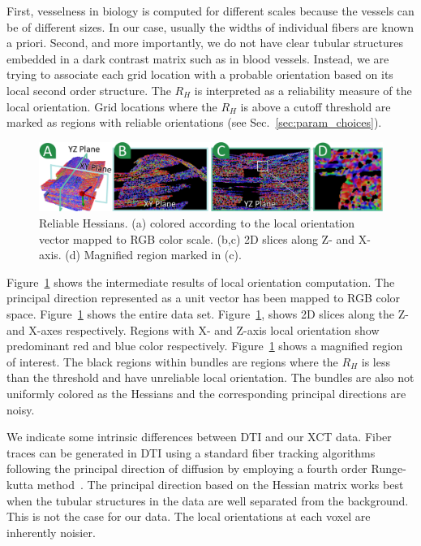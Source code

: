 First, vesselness in biology is computed for different scales because the vessels can be of different sizes. In our case, usually the widths of individual fibers are known a priori.
Second, and more importantly, we do not have clear tubular structures embedded in a dark contrast matrix such as in blood vessels.
Instead, we are trying to associate each grid location  with a probable orientation based on its local second order structure. The $R_{H}$ is interpreted as a reliability measure of the local orientation.
Grid locations where the $R_{H}$ is above a cutoff threshold are marked as regions with reliable orientations (see Sec.~\ref{sec:param_choices}).

\begin{figure}[tb]
\centering
\includegraphics[width=\linewidth]{images/reliable_hessian.eps}
 \vspace{-1.5em}
\caption{Reliable Hessians. (a) \mt colored according to the local orientation vector mapped to RGB color scale. (b,c) 2D slices along Z- and X- axis. (d) Magnified region marked in (c).}
\label{fig:reliable_hessian}
\vskip-0.2cm
\end{figure}
Figure~\ref{fig:reliable_hessian} shows the intermediate results of local orientation computation.
The principal direction represented as a unit vector has been mapped to RGB color space.
Figure~\ref{fig:reliable_hessian} shows the entire data set. 
Figure~\ref{fig:reliable_hessian}, shows 2D slices along the Z- and X-axes respectively. Regions with X- and Z-axis local orientation show predominant red and blue color respectively.   Figure~\ref{fig:reliable_hessian} shows a magnified region of interest. The black regions within bundles are regions where the $R_H$ is less than the threshold and have unreliable local orientation. The bundles are also not uniformly colored as the Hessians and the corresponding principal directions are noisy.

We indicate some intrinsic differences between DTI and our XCT data. Fiber traces can be generated in DTI using a standard fiber tracking algorithms following the principal direction of diffusion by employing a fourth order Runge-kutta method~\cite{Brun2003}. The principal direction based on the Hessian matrix works best when the tubular structures in the data are well separated from the background. This is not the case for our data. The local orientations at each voxel are inherently noisier.
